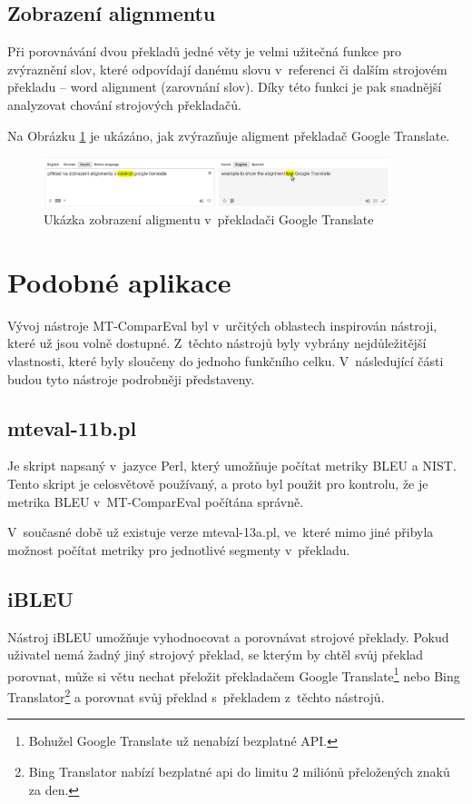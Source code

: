\subsection{Zobrazení alignmentu}
Při porovnávání dvou překladů jedné věty je velmi užitečná funkce pro zvýraznění slov,
  které odpovídají danému slovu v~referenci či dalším strojovém překladu -- word alignment (zarovnání slov).
Díky této funkci je pak snadnější analyzovat chování strojových překladačů.

Na Obrázku \ref{img:alignment} je ukázáno, jak zvýrazňuje aligment překladač Google Translate.
\begin{figure}
	\center
	\includegraphics[width=0.9\textwidth]{img/alignment.eps}
	\caption{Ukázka zobrazení aligmentu v~překladači Google Translate}
	\label{img:alignment}
\end{figure}

\section{Podobné aplikace}
Vývoj nástroje \mbox{MT-ComparEval} byl v~určitých oblastech inspirován nástroji,
  které už jsou volně dostupné.
Z~těchto nástrojů byly vybrány nejdůležitější vlastnosti,
  které byly sloučeny do jednoho funkčního celku.
V~následující části budou tyto nástroje podrobněji představeny.

\subsection{mteval-11b.pl}
Je skript napsaný v~jazyce Perl,
  který umožňuje počítat metriky BLEU a NIST.
Tento skript je celosvětově používaný,
  a proto byl použit pro kontrolu,
  že je metrika BLEU v~\mbox{MT-ComparEval} počítána správně.

V~současné době už existuje verze mteval-13a.pl,
  ve~které mimo jiné přibyla možnost počítat metriky pro jednotlivé segmenty v~překladu.

\subsection{iBLEU}
Nástroj iBLEU umožňuje vyhodnocovat a porovnávat strojové překlady.
Pokud uživatel nemá žadný jiný strojový překlad,
  se kterým by chtěl svůj překlad porovnat,
  může si větu nechat přeložit překladačem Google Translate\footnote{
    Bohužel Google Translate už nenabízí bezplatné API.
  } nebo Bing Translator\footnote{
    Bing Translator nabízí bezplatné api do limitu 2 miliónů přeložených znaků za den.
  }
  a porovnat svůj překlad s~překladem z~těchto nástrojů.

